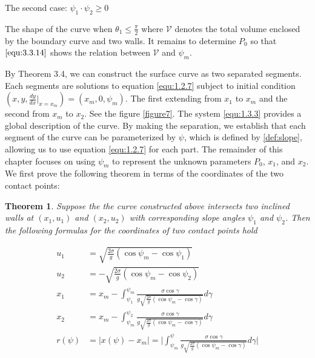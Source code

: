 \documentclass[letterpaper,reqno,10pt,twoside]{amsart}
\newtheorem{theorem}{Theorem}[section]
\theoremstyle{definition}
\theoremstyle{remark}
\begin{document}
\begin{section}{The second case: $\psi_1\cdot \psi_2\geq 0$ }
\begin{subsection}{The shape of the curve when $\theta_1\leq \frac{\pi}{2}$}
    \noindent where $\mathscr{V}$ denotes the total volume enclosed by the boundary curve and two walls. It remains to determine $P_{0}$ so that $\eqref{equ:3.3.14}$ shows the relation between $\mathscr{V}$ and $\psi_{m}$.
    
    
     By Theorem 3.4, we can construct the surface curve as two separated segments. Each segments are solutions to equation \eqref{equ:1.2.7} subject to initial condition $(x,y,\frac{dy}{dx}|_{x=x_{m}})=(x_{m},0,\psi_{m})$. The first extending from $x_1$ to $x_m$ and the second from $x_m$ to $x_2$. See the figure \ref{figure7}. The system \eqref{equ:1.3.3} provides a global description of the curve. By making the separation, we establish that each segment of the curve can be parameterized by $\psi$, which is defined by \eqref{def:slope}, allowing us to use equation \eqref{equ:1.2.7} for each part. The remainder of this chapter focuses on using $\psi_{m}$ to represent the unknown parameters $P_{0}$, $x_1$, and $x_2$. We first prove the following theorem in terms of the coordinates of the two contact points:

        \begin{theorem}

             Suppose the the curve constructed above intersects two inclined walls at $(x_{1},u_{1})$ and $(x_{2},u_{2})$ with corresponding slope angles $\psi_{1}$ and $\psi_{2}$. Then the following formulas for the coordinates of two contact points hold

            \begin{align}
                u_1&=\sqrt{\frac{2\sigma}{g}(\cos\psi_m-\cos\psi_1)} \label{equ:3.2.2}\\
                u_2&=-\sqrt{\frac{2\sigma}{g}(\cos\psi_m-\cos\psi_2)} \label{equ:3.2.3}\\
                x_1&=x_m-\int_{\psi_1}^{\psi_m}\frac{\sigma\cos\gamma}{g\sqrt{\frac{2\sigma}{g}(\cos\psi_m-\cos\gamma)}}d\gamma \label{equ:3.2.4}\\
                x_2&=x_m-\int_{\psi_m}^{\psi_2}\frac{\sigma\cos\gamma}{g\sqrt{\frac{2\sigma}{g}(\cos\psi_m-\cos\gamma)}}d\gamma \label{3.2.5}\\
                r(\psi)&=\vert x(\psi)-x_m\vert=\vert\int_{\psi_m}^{\psi}\frac{\sigma\cos\gamma}{g\sqrt{\frac{2\sigma}{g}(\cos\psi_m-\cos\gamma)}}d\gamma \label{3.2.100} \vert
            \end{align}
            

            
            

\end{theorem}
\end{subsection}
\end{section}
\end{document}
